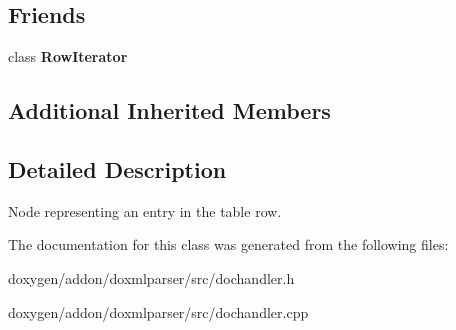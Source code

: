\subsection*{Friends}
\begin{DoxyCompactItemize}
\item 
\mbox{\label{class_row_handler_a7ab697b5571195fc27a2ad43eac538e1}} 
class {\bfseries Row\+Iterator}
\end{DoxyCompactItemize}
\subsection*{Additional Inherited Members}


\subsection{Detailed Description}
Node representing an entry in the table row. 



The documentation for this class was generated from the following files\+:\begin{DoxyCompactItemize}
\item 
doxygen/addon/doxmlparser/src/dochandler.\+h\item 
doxygen/addon/doxmlparser/src/dochandler.\+cpp\end{DoxyCompactItemize}
